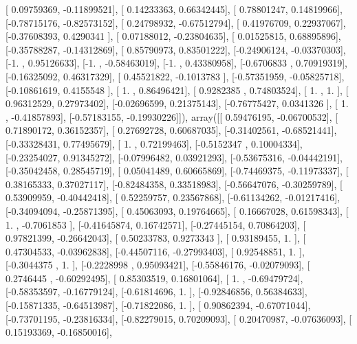 \documentclass{article}
\begin{document}
       [ 0.09759369, -0.11899521],
       [ 0.14233363,  0.66342445],
       [ 0.78801247,  0.14819966],
       [-0.78715176, -0.82573152],
       [ 0.24798932, -0.67512794],
       [ 0.41976709,  0.22937067],
       [-0.37608393,  0.4290341 ],
       [ 0.07188012, -0.23804635],
       [ 0.01525815,  0.68895896],
       [-0.35788287, -0.14312869],
       [ 0.85790973,  0.83501222],
       [-0.24906124, -0.03370303],
       [-1.        ,  0.95126633],
       [-1.        , -0.58463019],
       [-1.        ,  0.43380958],
       [-0.6706833 ,  0.70919319],
       [-0.16325092,  0.46317329],
       [ 0.45521822, -0.1013783 ],
       [-0.57351959, -0.05825718],
       [-0.10861619,  0.4155548 ],
       [ 1.        ,  0.86496421],
       [ 0.9282385 ,  0.74803524],
       [ 1.        ,  1.        ],
       [ 0.96312529,  0.27973402],
       [-0.02696599,  0.21375143],
       [-0.76775427,  0.0341326 ],
       [ 1.        , -0.41857893],
       [-0.57183155, -0.19930226]]), array([[ 0.59476195, -0.06700532],
       [ 0.71890172,  0.36152357],
       [ 0.27692728,  0.60687035],
       [-0.31402561, -0.68521441],
       [-0.33328431,  0.77495679],
       [ 1.        ,  0.72199463],
       [-0.5152347 ,  0.10004334],
       [-0.23254027,  0.91345272],
       [-0.07996482,  0.03921293],
       [-0.53675316, -0.04442191],
       [-0.35042458,  0.28545719],
       [ 0.05041489,  0.60665869],
       [-0.74469375, -0.11973337],
       [ 0.38165333,  0.37027117],
       [-0.82484358,  0.33518983],
       [-0.56647076, -0.30259789],
       [ 0.53909959, -0.40442418],
       [ 0.52259757,  0.23567868],
       [-0.61134262, -0.01217416],
       [-0.34094094, -0.25871395],
       [ 0.45063093,  0.19764665],
       [ 0.16667028,  0.61598343],
       [ 1.        , -0.7061853 ],
       [-0.41645874,  0.16742571],
       [-0.27445154,  0.70864203],
       [ 0.97821399, -0.26642043],
       [ 0.50233783,  0.9273343 ],
       [ 0.93189455,  1.        ],
       [ 0.47304533, -0.03962838],
       [-0.44507116, -0.27993403],
       [ 0.92548851,  1.        ],
       [-0.3044375 ,  1.        ],
       [-0.2228998 ,  0.95093421],
       [-0.55846176, -0.02079093],
       [ 0.2746445 , -0.60292495],
       [ 0.85303519,  0.16801064],
       [ 1.        , -0.69479724],
       [-0.58353597, -0.16779124],
       [-0.61814696,  1.        ],
       [-0.92846856,  0.56384633],
       [-0.15871335, -0.64513987],
       [-0.71822086,  1.        ],
       [ 0.90862394, -0.67071044],
       [-0.73701195, -0.23816334],
       [-0.82279015,  0.70209093],
       [ 0.20470987, -0.07636093],
       [ 0.15193369, -0.16850016],
\end{document}
